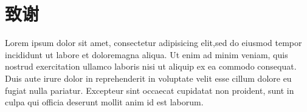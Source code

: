 
\chapter*{致谢}%

Lorem ipsum dolor sit amet, consectetur adipisicing elit,sed do eiusmod tempor incididunt ut labore et doloremagna aliqua.
Ut enim ad minim veniam, quis nostrud exercitation ullamco laboris nisi ut aliquip ex ea commodo consequat.
Duis aute irure dolor in reprehenderit in voluptate velit esse cillum dolore eu fugiat nulla pariatur.
Excepteur sint occaecat cupidatat non proident, sunt in culpa qui officia deserunt mollit anim id est laborum.














